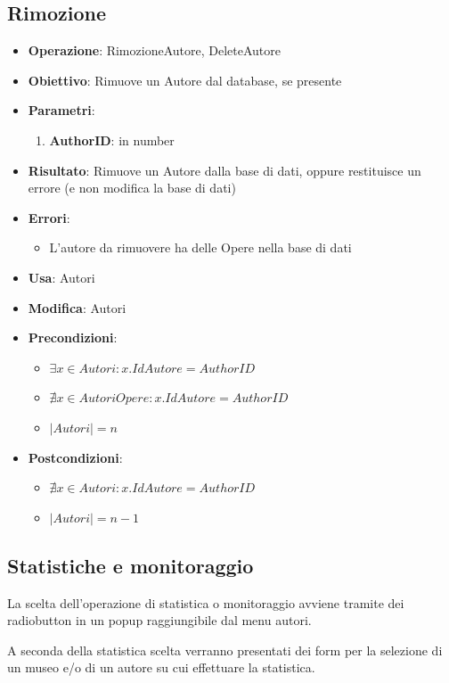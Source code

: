 \subsection{Rimozione}
\begin{itemize}
	\item \textbf{Operazione}: RimozioneAutore, DeleteAutore
	\item \textbf{Obiettivo}: Rimuove un Autore dal database, se presente
	\item \textbf{Parametri}:
	\begin{enumerate}
		\item \textbf{AuthorID}: in number
	\end{enumerate}
	\item \textbf{Risultato}: Rimuove un Autore dalla base di dati, oppure restituisce un errore (e non modifica la base di dati)
	\item \textbf{Errori}: 
	\begin{itemize}
		\item L'autore da rimuovere ha delle Opere nella base di dati
	\end{itemize}
	\item \textbf{Usa}: Autori
	\item \textbf{Modifica}: Autori
	\item \textbf{Precondizioni}:
	\begin{itemize}
		\item $\exists x \in Autori : x.IdAutore = AuthorID$
		\item $\nexists x \in AutoriOpere : x.IdAutore = AuthorID$
		\item $|Autori| = n$
	\end{itemize}
	\item \textbf{Postcondizioni}:
	\begin{itemize}
		\item $\nexists x \in Autori : x.IdAutore = AuthorID$
		\item $|Autori| = n - 1$
	\end{itemize}
\end{itemize}


\subsection{Statistiche e monitoraggio}
La scelta dell'operazione di statistica o monitoraggio avviene tramite dei radiobutton in un popup raggiungibile dal menu autori.

A seconda della statistica scelta verranno presentati dei form per la selezione di un museo e/o di un autore su cui effettuare la statistica.

